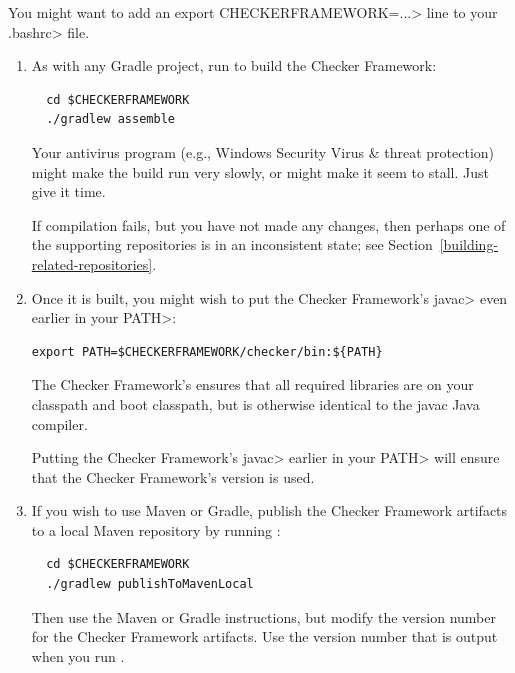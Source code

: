 You might want to add an \<export CHECKERFRAMEWORK=...> line to your
\<.bashrc> file.




\begin{enumerate}

\item
As with any Gradle project, run  to build the Checker Framework:

\begin{Verbatim}
  cd $CHECKERFRAMEWORK
  ./gradlew assemble
\end{Verbatim}

\noindent
Your antivirus program (e.g., Windows Security Virus \& threat protection)
might make the build run very slowly, or might make it seem to stall.  Just
give it time.

If compilation fails, but you have not made any changes, then perhaps one
of the supporting repositories is in an inconsistent state; see
Section~\ref{building-related-repositories}.

\item
Once it is built, you might wish to put the Checker Framework's \<javac>
even earlier in your \<PATH>:

\begin{Verbatim}
export PATH=$CHECKERFRAMEWORK/checker/bin:${PATH}
\end{Verbatim}

The Checker Framework's  ensures that all required
libraries are on your classpath and boot classpath, but is otherwise
identical to the javac Java compiler.

Putting the Checker Framework's \<javac> earlier in your \<PATH> will
ensure that the Checker Framework's version is used.

\item
If you wish to use Maven or Gradle, publish the Checker Framework artifacts
to a local Maven repository by running :
\begin{Verbatim}
  cd $CHECKERFRAMEWORK
  ./gradlew publishToMavenLocal
\end{Verbatim}
Then use the Maven or Gradle instructions, but modify the version number for the Checker Framework artifacts.
Use the version number that is output when you run .


\end{enumerate}
